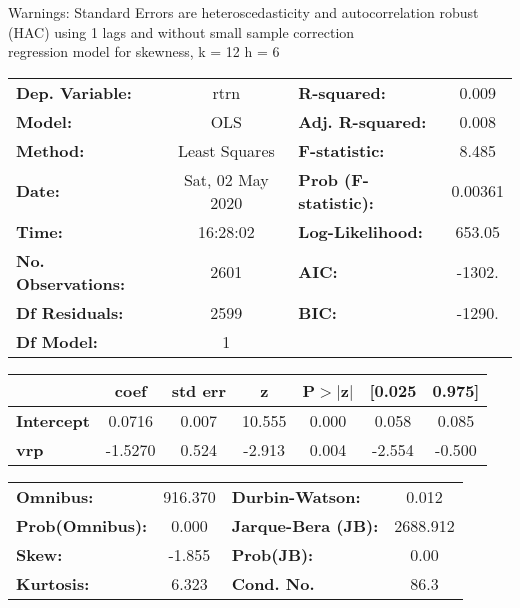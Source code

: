 Warnings: \newline
 [1] Standard Errors are heteroscedasticity and autocorrelation robust (HAC) using 1 lags and without small sample correction\\ 

regression model for skewness, k = 12 h = 6\begin{center}
\begin{tabular}{lclc}
\toprule
\textbf{Dep. Variable:}    &       rtrn       & \textbf{  R-squared:         } &     0.009   \\
\textbf{Model:}            &       OLS        & \textbf{  Adj. R-squared:    } &     0.008   \\
\textbf{Method:}           &  Least Squares   & \textbf{  F-statistic:       } &     8.485   \\
\textbf{Date:}             & Sat, 02 May 2020 & \textbf{  Prob (F-statistic):} &  0.00361    \\
\textbf{Time:}             &     16:28:02     & \textbf{  Log-Likelihood:    } &    653.05   \\
\textbf{No. Observations:} &        2601      & \textbf{  AIC:               } &    -1302.   \\
\textbf{Df Residuals:}     &        2599      & \textbf{  BIC:               } &    -1290.   \\
\textbf{Df Model:}         &           1      & \textbf{                     } &             \\
\bottomrule
\end{tabular}
\begin{tabular}{lcccccc}
                   & \textbf{coef} & \textbf{std err} & \textbf{z} & \textbf{P$> |$z$|$} & \textbf{[0.025} & \textbf{0.975]}  \\
\midrule
\textbf{Intercept} &       0.0716  &        0.007     &    10.555  &         0.000        &        0.058    &        0.085     \\
\textbf{vrp}       &      -1.5270  &        0.524     &    -2.913  &         0.004        &       -2.554    &       -0.500     \\
\bottomrule
\end{tabular}
\begin{tabular}{lclc}
\textbf{Omnibus:}       & 916.370 & \textbf{  Durbin-Watson:     } &    0.012  \\
\textbf{Prob(Omnibus):} &   0.000 & \textbf{  Jarque-Bera (JB):  } & 2688.912  \\
\textbf{Skew:}          &  -1.855 & \textbf{  Prob(JB):          } &     0.00  \\
\textbf{Kurtosis:}      &   6.323 & \textbf{  Cond. No.          } &     86.3  \\
\bottomrule
\end{tabular}
\end{center}

